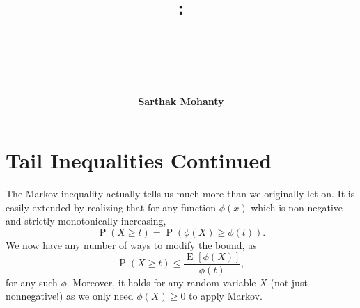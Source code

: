 \documentclass[14pt]{extreport}
\title{
    \vspace{1.75in}
    \textbf{\lectClass:\\ \lectTitle}\\
    \vspace{0.1in}\large{\textit{\lectClassInstructor\ \lectSection}}
    \vspace{2in}
    \author{\textbf{Sarthak Mohanty}}
    \date{}
}
\newcommand{\E}[2][]{\operatorname{E}_{#1}\left[#2\right]}
\renewcommand{\Pr}[1]{\operatorname{P}\left(#1\right)}
\begin{document}
\maketitle
\pagebreak

\section*{Tail Inequalities Continued}

The Markov inequality actually tells us much more than we originally let on. It is easily extended by realizing that for any function $\phi(x)$ which is non-negative and strictly monotonically increasing, $$\Pr{X \ge t} = \Pr{\phi(X) \ge \phi(t)}.$$ We now have any number of ways to modify the bound, as $$\Pr{X \ge t} \le \frac{\E{\phi(X)}}{\phi(t)},$$ for any such $\phi$. Moreover, it holds for any random variable $X$ (not just nonnegative!) as we only need $\phi(X) \ge 0$ to apply Markov.
\end{document}
